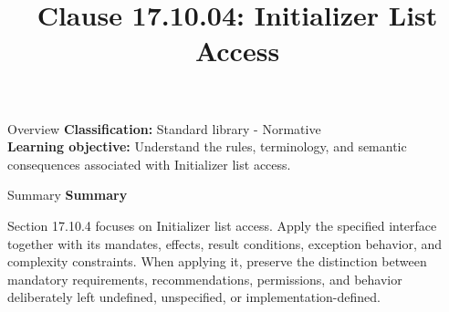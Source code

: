 \documentclass[10pt,letterpaper]{article}
\title{Clause 17.10.04: Initializer List Access}
\author{}
\date{}
\begin{document}
\maketitle
\begin{CornellOverviewBox}{Overview}
\textbf{Classification:} Standard library - Normative\\[2pt]
\textbf{Learning objective:} Understand the rules, terminology, and semantic consequences associated with Initializer list access.
\end{CornellOverviewBox}\begin{CornellSummaryBox}{Summary}
{\sffamily\bfseries\color{Accent} Summary}\par\vspace{3pt}Section 17.10.4 focuses on Initializer list access. Apply the specified interface together with its mandates, effects, result conditions, exception behavior, and complexity constraints. When applying it, preserve the distinction between mandatory requirements, recommendations, permissions, and behavior deliberately left undefined, unspecified, or implementation-defined.
\end{CornellSummaryBox}
\end{document}
